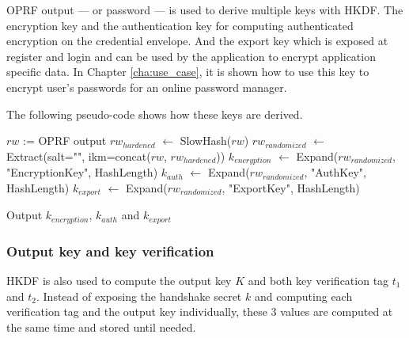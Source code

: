 \documentclass[../report.tex]{subfiles}
\begin{document}
OPRF output --- or password --- is used to derive multiple keys with HKDF. The encryption key and the authentication key for computing authenticated encryption on the credential envelope. And the export key which is exposed at register and login and can be used by the application to encrypt application specific data. In Chapter \ref{cha:use_case}, it is shown how to use this key to encrypt user's passwords for an online password manager.

The following pseudo-code shows how these keys are derived.
\begin{algorithmic}
\Require $rw$ := OPRF output
\State $rw_{hardened}$ $\gets$ SlowHash($rw$)
\State $rw_{randomized}$ $\gets$ Extract(salt="", ikm=concat($rw$, $rw_{hardened}$))
\State $k_{encryption}$ $\gets$ Expand($rw_{randomized}$, "EncryptionKey", HashLength)
\State $k_{auth}$ $\gets$ Expand($rw_{randomized}$, "AuthKey", HashLength)
\State $k_{export}$ $\gets$ Expand($rw_{randomized}$, "ExportKey", HashLength)

\State Output $k_{encryption}$, $k_{auth}$ and $k_{export}$
\end{algorithmic}



% 
% 


\subsubsection{Output key and key verification}

HKDF is also used to compute the output key $K$ and both key verification tag $t_1$ and $t_2$.
Instead of exposing the handshake secret $k$ and computing each verification tag and the output key individually, these 3 values are computed at the same time and stored until needed.
\end{document}
